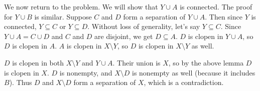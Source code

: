 We now return to the problem. We will show that $Y \cup A$ is connected. The proof for $Y \cup B$ is similar. Suppose $C$ and $D$ form a separation of $Y \cup A$. Then since $Y$ is connected, $Y \subseteq C$ or $Y \subseteq D$. Without loss of generality, let's say $Y \subseteq C$. Since $Y \cup A = C \cup D$ and $C$ and $D$ are disjoint, we get $D \subseteq A$. $D$ is clopen in $Y \cup A$, so $D$ is clopen in $A$. $A$ is clopen in $X \setminus Y$, so $D$ is clopen in $X \setminus Y$ as well.

$D$ is clopen in both $X \setminus Y$ and $Y \cup A$. Their union is $X$, so by the above lemma $D$ is clopen in $X$. $D$ is nonempty, and $X \setminus D$ is nonempty as well (because it includes $B$). Thus $D$ and $X \setminus D$ form a separation of $X$, which is a contradiction.
